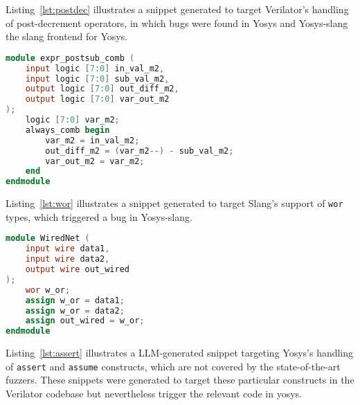 Listing~\ref{lst:postdec} illustrates a snippet generated to target Verilator's handling of post-decrement operators, in which bugs were found in Yosys and Yosys-slang the slang frontend for Yosys.
\begin{lstlisting}[language=verilog,caption={Example of a snippet generated to target Verilator's handling of post-decrement operators.},label={lst:postdec},breaklines=true]
module expr_postsub_comb (
    input logic [7:0] in_val_m2,
    input logic [7:0] sub_val_m2,
    output logic [7:0] out_diff_m2,
    output logic [7:0] var_out_m2
);
    logic [7:0] var_m2;
    always_comb begin
        var_m2 = in_val_m2;
        out_diff_m2 = (var_m2--) - sub_val_m2;
        var_out_m2 = var_m2;
    end
endmodule
\end{lstlisting}

Listing~\ref{lst:wor} illustrates a snippet generated to target Slang's support of \texttt{wor} types, which triggered a bug in Yosys-slang.
\begin{lstlisting}[language=verilog,caption={Example of a snippet generated to target Slang's support of wor types},label={lst:wor},breaklines=true]
module WiredNet (
    input wire data1,
    input wire data2,
    output wire out_wired
);
    wor w_or;
    assign w_or = data1;
    assign w_or = data2;
    assign out_wired = w_or;
endmodule
\end{lstlisting}

Listing~\ref{lst:assert} illustrates a LLM-generated snippet targeting Yosys's handling of \texttt{assert} and \texttt{assume} constructs, which are not covered by the state-of-the-art fuzzers.
These snippets were generated to target these particular constructs in the Verilator codebase but nevertheless trigger the relevant code in yosys.

